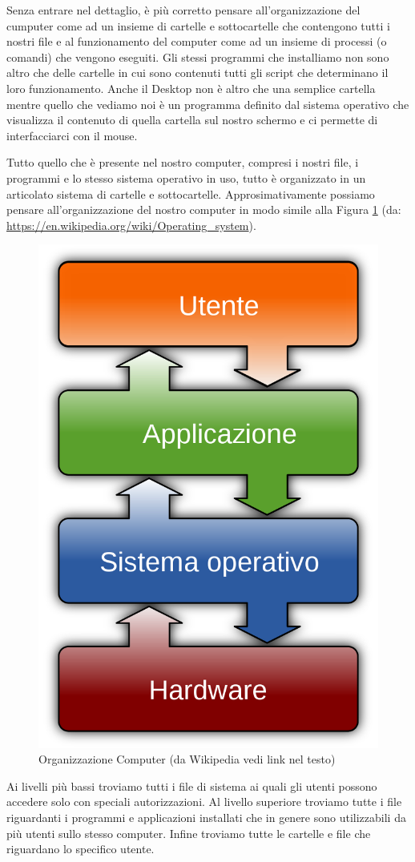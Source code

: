 \documentclass[
]{book}
\begin{document}
Senza entrare nel dettaglio, è più corretto pensare all'organizzazione del cumputer come ad un insieme di cartelle e sottocartelle che contengono tutti i nostri file e al funzionamento del computer come ad un insieme di processi (o comandi) che vengono eseguiti. Gli stessi programmi che installiamo non sono altro che delle cartelle in cui sono contenuti tutti gli script che determinano il loro funzionamento. Anche il Desktop non è altro che una semplice cartella mentre quello che vediamo noi è un programma definito dal sistema operativo che visualizza il contenuto di quella cartella sul nostro schermo e ci permette di interfacciarci con il mouse.

Tutto quello che è presente nel nostro computer, compresi i nostri file, i programmi e lo stesso sistema operativo in uso, tutto è organizzato in un articolato sistema di cartelle e sottocartelle. Approsimativamente possiamo pensare all'organizzazione del nostro computer in modo simile alla Figura \ref{fig:file-system} (da: \url{https://en.wikipedia.org/wiki/Operating_system}).

\begin{figure}

{\centering \includegraphics[width=0.35\linewidth]{images/File-System} 

}

\caption{Organizzazione Computer (da Wikipedia vedi link nel testo)}\label{fig:file-system}
\end{figure}

Ai livelli più bassi troviamo tutti i file di sistema ai quali gli utenti possono accedere solo con speciali autorizzazioni. Al livello superiore troviamo tutte i file riguardanti i programmi e applicazioni installati che in genere sono utilizzabili da più utenti sullo stesso computer. Infine troviamo tutte le cartelle e file che riguardano lo specifico utente.
\end{document}
